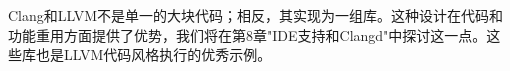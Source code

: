 Clang和LLVM不是单一的大块代码；相反，其实现为一组库。这种设计在代码和功能重用方面提供了优势，我们将在第8章"IDE支持和Clangd"中探讨这一点。这些库也是LLVM代码风格执行的优秀示例。



































































































